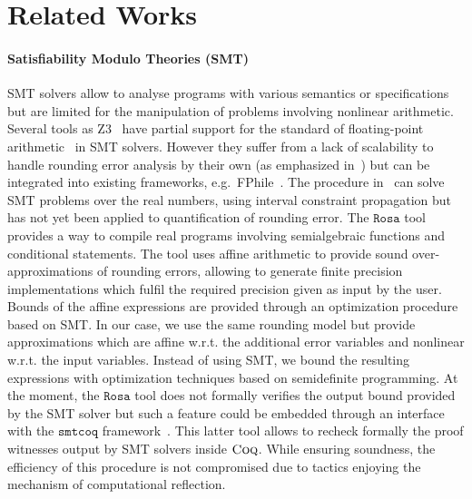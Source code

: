 \documentclass[preprint]{sigplanconf}
\newcommand{\smtcoq}{\mathtt{smtcoq}}
\newcommand{\op}{\mathtt{op}}
\newcommand{\coq}{\text{\sc Coq}}
\newcommand{\rosa}{\mathtt{Rosa}}
\newcommand{\fptaylor}{\mathtt{FPTaylor}}
\theoremstyle{plain}
\begin{document}
\section{Related Works}
%
\paragraph{Satisfiability Modulo Theories (SMT)}
SMT solvers allow to analyse programs with various semantics or specifications but are limited for the manipulation of problems involving nonlinear arithmetic. 
Several tools as {\sc Z3}~\cite{DeMoura08} have partial support for the standard of floating-point arithmetic~\cite{smtFPA2010} in SMT solvers. However they suffer from a lack of  scalability to handle rounding error analysis by their own (as emphasized in~\cite{Darulova14Popl}) but can be integrated into existing frameworks, e.g.~{\sc FPhile}~\cite{PaganelliA13}. The procedure in~\cite{dReal13} can solve SMT problems over the real numbers, using interval constraint propagation but has not yet been applied to quantification of rounding error.
The $\rosa$ tool~\cite{Darulova14Popl} provides a way to compile real programs involving semialgebraic functions and conditional statements.
The tool uses affine arithmetic to provide sound over-approximations of rounding errors, allowing to generate finite precision implementations which fulfil the required precision given as input by the user. Bounds of the affine expressions are provided through an optimization procedure based on SMT. In our case, we use the same rounding model but provide approximations which are affine w.r.t. the additional error variables and nonlinear w.r.t. the input variables. Instead of using SMT, we bound the resulting expressions with optimization techniques based on semidefinite programming.
At the moment, the $\rosa$ tool does not formally verifies the output bound provided by the SMT solver but such a feature could be embedded through an interface with the $\smtcoq$ framework~\cite{smtcoq}. This latter tool allows to recheck formally the proof witnesses output by SMT solvers inside $\coq$. While ensuring soundness, the efficiency of this procedure is not compromised due to tactics enjoying the mechanism of computational reflection.
%
\end{document}
